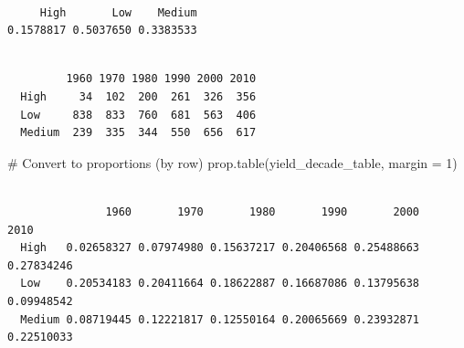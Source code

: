 \documentclass[
  letterpaper,
]{book}
\newenvironment{Shaded}{\begin{snugshade}}{\end{snugshade}}
\newcommand{\AttributeTok}[1]{\textcolor[rgb]{0.40,0.45,0.13}{#1}}
\newcommand{\CommentTok}[1]{\textcolor[rgb]{0.37,0.37,0.37}{#1}}
\newcommand{\DecValTok}[1]{\textcolor[rgb]{0.68,0.00,0.00}{#1}}
\newcommand{\FunctionTok}[1]{\textcolor[rgb]{0.28,0.35,0.67}{#1}}
\newcommand{\NormalTok}[1]{\textcolor[rgb]{0.00,0.23,0.31}{#1}}
\newcommand{\OtherTok}[1]{\textcolor[rgb]{0.00,0.23,0.31}{#1}}
\newcommand{\SpecialCharTok}[1]{\textcolor[rgb]{0.37,0.37,0.37}{#1}}
\begin{document}
\begin{verbatim}

     High       Low    Medium 
0.1578817 0.5037650 0.3383533 
\end{verbatim}

\begin{Shaded}
\end{Shaded}

\begin{verbatim}
        
         1960 1970 1980 1990 2000 2010
  High     34  102  200  261  326  356
  Low     838  833  760  681  563  406
  Medium  239  335  344  550  656  617
\end{verbatim}

\begin{Shaded}
\begin{Highlighting}[]
\CommentTok{\# Convert to proportions (by row)}
\FunctionTok{prop.table}\NormalTok{(yield\_decade\_table, }\AttributeTok{margin =} \DecValTok{1}\NormalTok{)}
\end{Highlighting}
\end{Shaded}

\begin{verbatim}
        
               1960       1970       1980       1990       2000       2010
  High   0.02658327 0.07974980 0.15637217 0.20406568 0.25488663 0.27834246
  Low    0.20534183 0.20411664 0.18622887 0.16687086 0.13795638 0.09948542
  Medium 0.08719445 0.12221817 0.12550164 0.20065669 0.23932871 0.22510033
\end{verbatim}
\end{document}
